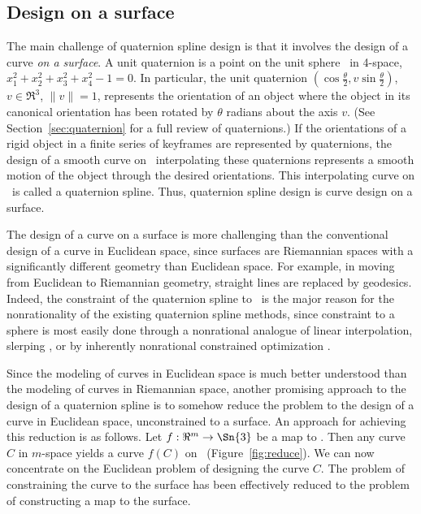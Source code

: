 \subsection{Design on a surface}
\label{subsec:design}

The main challenge of quaternion spline design is that it involves the design of
a curve {\em on a surface}.
A unit quaternion is a point on the unit sphere \ in 4-space,
$x_1^2 + x_2^2 + x_3^2 + x_4^2 - 1 = 0$.
In particular, the unit quaternion 
$(\cos \frac{\theta}{2}, v \sin \frac{\theta}{2})$, $v \in \Re^3$, $\|v\|=1$,
represents the orientation of an object 
where the object in its canonical orientation 
has been rotated by $\theta$ radians about the axis $v$.
(See Section~\ref{sec:quaternion} for a full review of quaternions.)
If the orientations of a rigid object in a finite series of keyframes are
represented by quaternions, the design of a smooth curve
on \ interpolating these quaternions represents a smooth
motion of the object through the desired orientations.
This interpolating curve on \ is called a quaternion spline.
Thus, quaternion spline design is curve design on a surface.

The design of a curve on a surface is more challenging than the conventional
design of a curve in Euclidean space, since surfaces are Riemannian spaces
with a significantly different geometry than Euclidean space.
For example, in moving from Euclidean to Riemannian geometry, 
straight lines are replaced by geodesics.
Indeed, the constraint of the quaternion spline to \ is the major 
reason for the nonrationality of the existing quaternion spline methods, 
since constraint to a sphere is most easily
done through a nonrational analogue of linear interpolation, slerping
\cite{shoemake85,duff85,pletinckx89,schlag91,nielson92,nielson93,kim95,nam95},
or by inherently nonrational constrained optimization \cite{barr92,rama97}.

Since the modeling of curves in Euclidean space
is much better understood than the modeling of curves in Riemannian space, 
another promising approach to the
design of a quaternion spline is to somehow reduce the problem to the 
design of a curve in Euclidean space, unconstrained to a surface.
An approach for achieving this reduction is as follows.
Let $f:\Re^m \rightarrow \Sn{3}$ be a map to .
Then any curve $C$ in $m$-space yields a curve $f(C)$ on \ 
(Figure~\ref{fig:reduce}).
We can now concentrate on the Euclidean problem of designing the curve $C$.
The problem of constraining the curve to the surface has been
effectively reduced to the problem of constructing a map to the surface.


